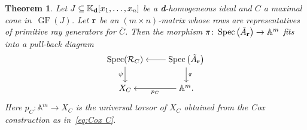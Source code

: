 \documentclass[10pt,a4paper]{amsart}
\newcommand{\thlabel}[1]{\label{#1}}
\newtheorem{Theorem}{Theorem}[section]
\numberwithin{equation}{section}
\DeclareMathOperator{\GF}{GF}
\begin{document}
\begin{Theorem}\thlabel{thm:KM max cone}
Let $J\subseteq\mathbb K_{\bf d}[{x_1,\dots,x_n}]$ be a {\bf d}-homogeneous ideal and $C$ a maximal cone in~$\GF(J)$.
Let ${\bf r}$ be an $(m\times n)$-matrix whose rows are representatives of primitive ray generators for $\overline C$. %
Then the morphism $\pi\colon \operatorname{Spec}\big(\tilde A_{\bf r}\big)\to \mathbb A^m$ fits into a pull-back diagram
 \begin{equation*}%
 \begin{tikzcd}[ampersand replacement=\&,cramped]
 \operatorname{Spec}(\mathcal R_C)\ar[d,"\psi"'] \&
 \operatorname{Spec}\big(\tilde A_{\bf r}\big)\ar[d,"\pi"] \ar[l]\\
 X_{C}\& \mathbb A^m. \ar[l,"p_C"]
 \end{tikzcd}
 \end{equation*}
Here $p_C\colon \mathbb A^m\to X_C$ is the universal torsor of $X_C$ obtained from the Cox construction as in~\eqref{eq:Cox C}.
\end{Theorem}
\end{document}
